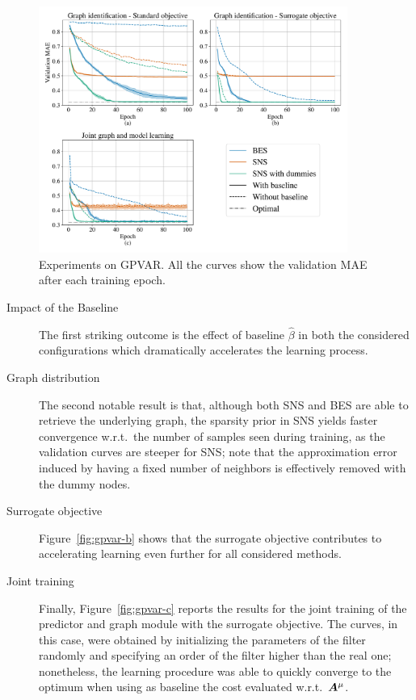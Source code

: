 \begin{figure}[t]
    \centering
    \includegraphics[width=0.9\textwidth]{imgs/gpvar.pdf}
    
    \begin{minipage}{0.32\textwidth}
    \end{minipage}
    \begin{minipage}{0.32\textwidth}
    \end{minipage}
    \begin{minipage}{0.32\textwidth}
    \end{minipage}
    \caption{Experiments on GPVAR. All the curves show the validation MAE after each training epoch. 
    }
    \label{fig:gpvar}
\end{figure}

\begin{description}
\item[Impact of the Baseline]
The first striking outcome is the effect of baseline $\hat\beta$ in both the considered configurations which dramatically accelerates the learning process. 
\item[Graph distribution]
The second notable result is that, although both SNS and BES are able to retrieve the underlying graph, the sparsity prior in SNS yields faster convergence w.r.t.\ the number of samples seen during training, as the validation curves are steeper for SNS; note that the approximation error induced by having a fixed number of neighbors is effectively removed with the dummy nodes. 
\item[Surrogate objective]
Figure~\ref{fig:gpvar-b} shows that the surrogate objective contributes to accelerating learning even further for all considered methods. 
\item[Joint training]
Finally, Figure~\ref{fig:gpvar-c} reports the results for the joint training of the predictor and graph module with the surrogate objective. The curves, in this case, were obtained by initializing the parameters of the filter randomly and specifying an order of the filter higher than the real one; nonetheless, the learning procedure was able to quickly converge to the optimum when using as baseline the cost evaluated w.r.t.\ ${\bm{A}}^\mu$.
\end{description}

